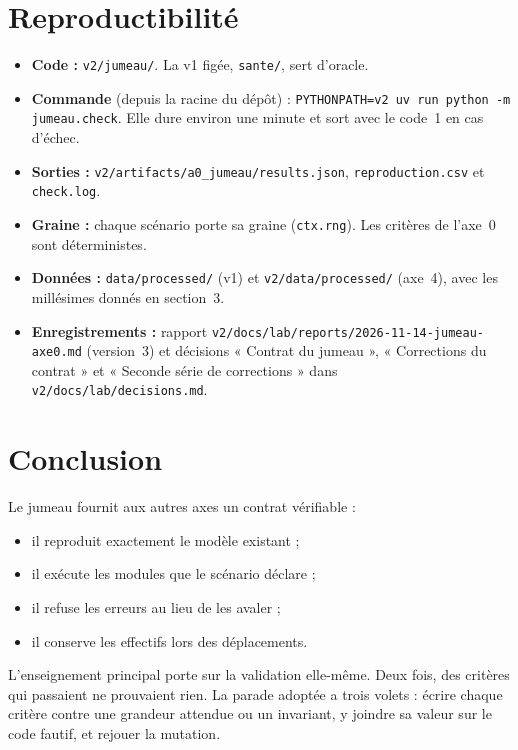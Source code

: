 \section{Reproductibilité}
\begin{itemize}
  \item \textbf{Code :} \texttt{v2/jumeau/}. La v1 figée, \texttt{sante/}, sert d'oracle.
  \item \textbf{Commande} (depuis la racine du dépôt) :
        \texttt{PYTHONPATH=v2 uv run python -m jumeau.check}. Elle dure environ une minute et sort
        avec le code~1 en cas d'échec.
  \item \textbf{Sorties :} \texttt{v2/artifacts/a0\_jumeau/results.json}, \texttt{reproduction.csv}
        et \texttt{check.log}.
  \item \textbf{Graine :} chaque scénario porte sa graine (\texttt{ctx.rng}). Les critères de l'axe~0
        sont déterministes.
  \item \textbf{Données :} \texttt{data/processed/} (v1) et \texttt{v2/data/processed/} (axe~4), avec
        les millésimes donnés en section~3.
  \item \textbf{Enregistrements :} rapport \texttt{v2/docs/lab/reports/2026-11-14-jumeau-axe0.md}
        (version~3) et décisions « Contrat du jumeau », « Corrections du contrat » et « Seconde série
        de corrections » dans \texttt{v2/docs/lab/decisions.md}.
\end{itemize}

\section{Conclusion}
Le jumeau fournit aux autres axes un contrat vérifiable :
\begin{itemize}
  \item il reproduit exactement le modèle existant ;
  \item il exécute les modules que le scénario déclare ;
  \item il refuse les erreurs au lieu de les avaler ;
  \item il conserve les effectifs lors des déplacements.
\end{itemize}
L'enseignement principal porte sur la validation elle-même. Deux fois, des critères qui passaient
ne prouvaient rien. La parade adoptée a trois volets : écrire chaque critère contre une grandeur
attendue ou un invariant, y joindre sa valeur sur le code fautif, et rejouer la mutation.

